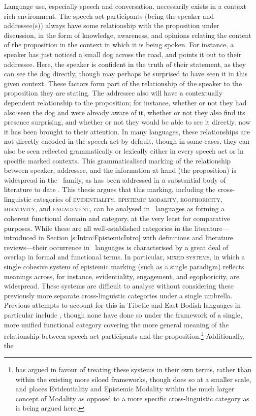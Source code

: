 Language use, especially speech and conversation, necessarily exists in a context rich environment. The speech act participants (being the speaker and addressee(s)) always have some relationship with the proposition under discussion, in the form of knowledge, awareness, and opinions relating the content of the proposition in the context in which it is being spoken. For instance, a speaker has just noticed a small dog across the road, and points it out to their addressee. Here, the speaker is confident in the truth of their statement, as they can see the dog directly, though may perhaps be surprised to have seen it in this given context. These factors form part of the relationship of the speaker to the proposition they are stating. The addressee also will have a contextually dependent relationship to the proposition; for instance, whether or not they had also seen the dog and were already aware of it, whether or not they also find its presence surprising, and whether or not they would be able to see it directly, now it has been brought to their attention. In many languages, these relationships are not directly encoded in the speech act by default, though in some cases, they can also be seen reflected grammatically or lexically either in every speech act or in specific marked contexts. This grammaticalised marking of the relationship between speaker, addressee, and the information at hand (the proposition) is widespread in the \lfam\ family, as has been addressed in a substantial body of literature to date \cites{Aikhenvald2004}{Hill2017}. This thesis argues that this marking, including the cross-linguistic categories of \textsc{evidentiality}, \textsc{epistemic modality}, \textsc{egophoricity}, \textsc{mirativity}, and \textsc{engagement}, can be analysed in \lfam\ languages as forming a coherent functional domain and category, at the very least for comparative purposes. While these are all well-established categories in the literature---introduced in Section \ref{s:Intro:EpistemicIntro} with definitions and literature reviews---their occurrence in \lfam\ languages is characterised by a great deal of overlap in formal and functional terms. In particular, \textsc{mixed systems}, in which a single cohesive system of epistemic marking (such as a single paradigm) reflects meanings across, for instance, evidentiality, engagement, and egophoricity, are widespread. These systems are difficult to analyse without considering these previously more separate cross-linguistic categories under a single umbrella. Previous attempts to account for this in Tibetic and East Bodish languages in particular include , though none have done so under the framework of a single, more unified functional category covering the more general meaning of the relationship between speech act participants and the proposition.\footnote{ has argued in favour of treating these systems in their own terms, rather than within the existing more siloed frameworks, though does so at a smaller scale, and places Evidentiality and Epistemic Modality within the much larger concept of Modality as opposed to a more specific cross-linguistic category as is being argued here.} Additionally, the 